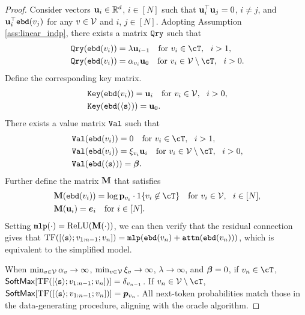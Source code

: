 \begin{proof}
Consider vectors ${\mathbf u}_{i}\in\mathbb{R}^d$, $i\in[N]$ such that ${\mathbf u}_i^\top{\mathbf u}_j=0$, $i\neq j$, and ${\mathbf u}_i^\top{\tt ebd}(v_j)$ for any $v\in\mathcal{V}$ and $i$, $j\in[N]$.
Adopting Assumption \ref{ass:linear_indp}, there exists a matrix ${\tt Qry}$ such that
\begin{equation}\label{appeqn:mlp-construct}
\begin{aligned}
&~\query(\embd(\tok_i)) = \lambda\bu_{i-1}~~~\text{for }\tok_i\in\cT,~~i>1,\\
&~\query(\embd(\tok_i)) = \sink_{\tok_i} \bu_{0}~~~\text{for }\tok_i\in\vocab\setminus\cT,~~i>0.\\
\end{aligned}
\end{equation}
Define the corresponding key matrix.
\begin{equation}
\begin{aligned}
&~{\tt Key}({\tt ebd}(v_i)) =  {\mathbf u}_{i}~~~\text{for }v_i\in\mathcal{V},~~i> 0,\\
&~{\tt Key}({\tt ebd}(\texttt{$\langle \texttt{s}\rangle$})) = {\mathbf u}_{0}.
\end{aligned}
\end{equation}
There exists a value matrix ${\tt Val}{}$ such that
\begin{equation}
\begin{aligned}
&~\val(\embd(\tok_i)) = 0~~~\text{for }\tok_i\in\cT,~~i> 1,\\
&~\val(\embd(\tok_i)) = \xi_{\tok_i}\bu_{i}~~~\text{for }\tok_i\in\vocab\setminus\cT,~~i> 0,\\
&~\val(\embd(\bos)) = \vecvalue.\\
\end{aligned}
\end{equation}
Further define the matrix ${\mathbf M}$ that satisfies
\begin{equation}
\begin{aligned}
&~ \bM (\embd(\tok_i)) = \log \bp_{\tok_i} \cdot 1\{ \tok_i \not\in \cT  \}  ~~~ \text{for } \tok_i \in \vocab,~~i\in[N],\\
&~ \bM  (\bu_i) = \bm{e}_i ~~~ \text{for }i\in[N].
\end{aligned}
\end{equation}
Setting ${\tt mlp}(\cdot)=\text{ReLU}({\mathbf M} (\cdot))$, we can then verify that the residual connection gives that ${\rm TF}([\texttt{$\langle \texttt{s}\rangle$}; v_{1:n-1}; v_n])={\tt mlp}({\tt ebd}(v_n)+{\tt attn}({\tt ebd}(v_n)))$, which is equivalent to the simplified model. 

When $\min_{v \in \mathcal{V}} \alpha_v \to\infty$, $\min_{v \in \mathcal{V}} \xi_v \to\infty$, $\lambda\to \infty$, and $\boldsymbol{\beta}=0$, if $v_n\in\cT$, ${\sf SoftMax}[{\rm TF}([\texttt{$\langle \texttt{s}\rangle$}; v_{1:n-1}; v_n])] = \delta_{v_{n-1}}$. If $\tok_{n}\in\vocab\setminus\cT$, ${\sf SoftMax}[{\rm TF}([\texttt{$\langle \texttt{s}\rangle$}; v_{1:n-1}; v_n])] = \bm{p}_{v_n}$. All next-token probabilities match those in the data-generating procedure, aligning with the oracle algorithm.
\end{proof}

